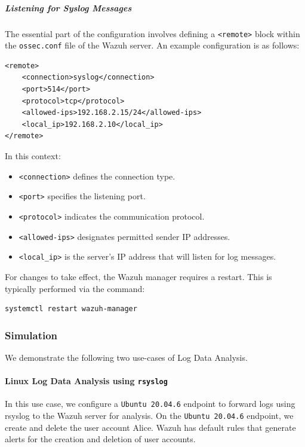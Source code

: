 \subparagraph{Listening for Syslog Messages}
The essential part of the configuration involves defining a \texttt{<remote>} block within the \texttt{ossec.conf} file of the Wazuh server. An example configuration is as follows:

\begin{verbatim}
<remote>
    <connection>syslog</connection>
    <port>514</port>
    <protocol>tcp</protocol>
    <allowed-ips>192.168.2.15/24</allowed-ips>
    <local_ip>192.168.2.10</local_ip>
</remote>
\end{verbatim}

In this context:
\begin{itemize}
    \item \texttt{<connection>} defines the connection type.
    \item \texttt{<port>} specifies the listening port.
    \item \texttt{<protocol>} indicates the communication protocol.
    \item \texttt{<allowed-ips>} designates permitted sender IP addresses.
    \item \texttt{<local\_ip>} is the server's IP address that will listen for log messages.
\end{itemize}

For changes to take effect, the Wazuh manager requires a restart. This is typically performed via the command:

\begin{verbatim}
systemctl restart wazuh-manager
\end{verbatim}

\subsubsection{Simulation}
We demonstrate the following two use-cases of Log Data Analysis.
\paragraph{Linux Log Data Analysis using \texttt{rsyslog}}
In this use case, we configure a \texttt{Ubuntu 20.04.6} endpoint to forward logs using rsyslog to the Wazuh server for analysis. On the \texttt{Ubuntu 20.04.6} endpoint, we create and delete the user account Alice. Wazuh has default rules that generate alerts for the creation and deletion of user accounts.

